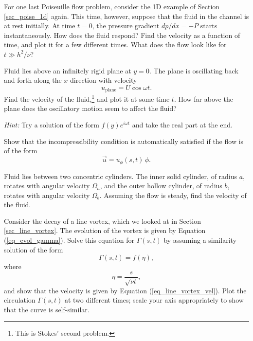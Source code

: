 \begin{problem}
\label{prob_poise_time}
For one last Poiseuille flow problem, consider the 1D example of Section \ref{sec_poise_1d} again.  This time, however, suppose that the fluid in the channel is at rest initially.  At time $t = 0$, the pressure gradient $dp/dx = -P$ starts instantaneously.  How does the fluid respond?  Find the velocity as a function of time, and plot it for a few different times.  What does the flow look like for $t \gg h^2 / \nu$?
\end{problem}

\begin{problem}
\label{prob_cyl_osc}
Fluid lies above an infinitely rigid plane at $y=0$.  The plane is oscillating back and forth along the $x$-direction with velocity
\[
u_\text{plane} = U \cos \omega t.
\]
Find the velocity of the fluid,\footnote{This is Stokes' second problem.} and plot it at some time $t$.  How far above the plane does the oscillatory motion seem to affect the fluid?

\emph{Hint:}  Try a solution of the form $f(y) e^{i \omega t}$ and take the real part at the end.
\end{problem}

\begin{problem}
\label{prob_cyl_incomp}
Show that the incompressibility condition is automatically satisfied if the flow is of the form 
\[
\vec{u} = u_\phi (s, t) \, \unit{\phi}.
\]
\end{problem}

\begin{problem}
\label{prob_cyl_two}
Fluid lies between two concentric cylinders.  The inner solid cylinder, of radius $a$, rotates with angular velocity $\Omega_a$, and the outer hollow cylinder, of radius $b$, rotates with angular velocity $\Omega_b$.  Assuming the flow is steady, find the velocity of the fluid.
\end{problem}

\begin{problem}
\label{prob_sim}
Consider the decay of a line vortex, which we looked at in Section \ref{sec_line_vortex}.  The evolution of the vortex is given by Equation (\ref{eq_evol_gamma}).  Solve this equation for $\Gamma(s, t)$ by assuming a similarity solution of the form
\[
\Gamma(s, t) = f(\eta),
\]
where 
\[
\eta = \frac{s}{\sqrt{\nu t}},
\]
and show that the velocity is given by Equation (\ref{eq_line_vortex_vel}).  Plot the circulation $\Gamma(s, t)$ at two different times; scale your axis appropriately to show that the curve is self-similar.
\end{problem}

